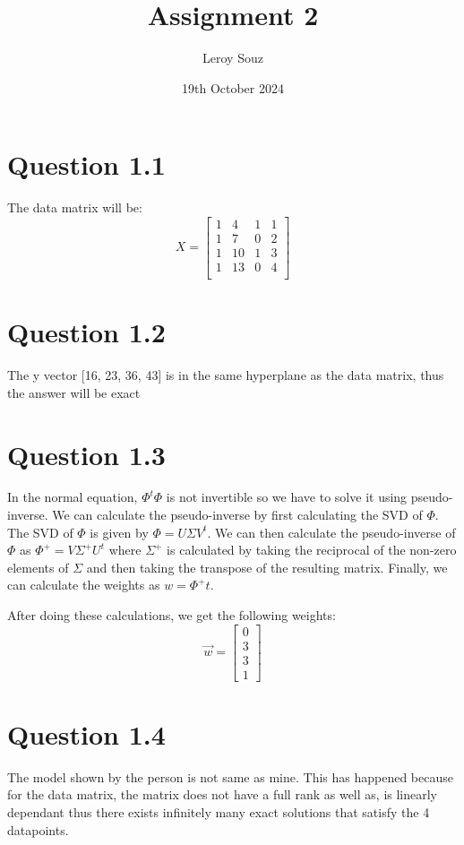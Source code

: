\documentclass{article}
\title{Assignment 2}
\author{Leroy Souz}
\date{19th October 2024}
\begin{document}
\maketitle

\section*{Question 1.1}
The data matrix will be:
$$
X = \begin{bmatrix}
    1 & 4 & 1 & 1 \\
    1 & 7 & 0 & 2 \\
    1 & 10 & 1 & 3 \\
    1 & 13 & 0 & 4 \\
\end{bmatrix}
$$

\section*{Question 1.2}
The y vector [16, 23, 36, 43] is in the same hyperplane as the data matrix,
thus the answer will be exact

\section*{Question 1.3}
In the normal equation, $\Phi^t\Phi$ is not invertible so we have to solve it
using pseudo-inverse. We can calculate the pseudo-inverse by first calculating
the SVD of $\Phi$. The SVD of $\Phi$ is given by $\Phi = U \Sigma V^t$. We can
then calculate the pseudo-inverse of $\Phi$ as $\Phi^+ = V \Sigma^+ U^t$ where
$\Sigma^+$ is calculated by taking the reciprocal of the non-zero elements of
$\Sigma$ and then taking the transpose of the resulting matrix. Finally, we can
calculate the weights as $w = \Phi^+ t$.

\noindent After doing these calculations, we get the following weights:
$$
\vec{w} = \begin{bmatrix}
    0 \\
    3 \\
    3 \\
    1
\end{bmatrix}
$$

\section*{Question 1.4}
The model shown by the person is not same as mine. This has happened because for
the data matrix, the matrix does not have a full rank as well as, is linearly
dependant thus there exists infinitely many exact solutions that satisfy the 4
datapoints.
\end{document}
